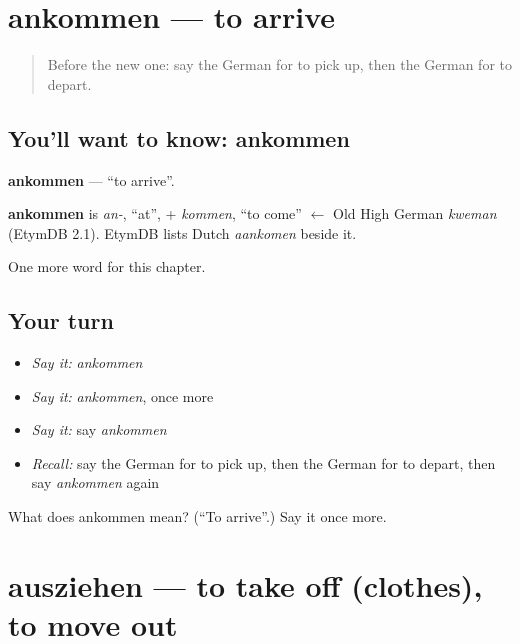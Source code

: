 \section[ankommen]{ankommen — to arrive}

\label{lesson:GE-C174-ankommen}



\begin{quote}
Before the new one: say the German for to pick up, then the German for to depart.
\end{quote}

\subsection*{You'll want to know: ankommen}
\textbf{ankommen} — \textquotedblleft{}to arrive\textquotedblright{}.

\begin{cousinweb}
\textbf{ankommen} is \emph{an-}, \textquotedblleft{}at\textquotedblright{}, + \emph{kommen}, \textquotedblleft{}to come\textquotedblright{} $\leftarrow$ Old High German \emph{kweman} (EtymDB 2.1). EtymDB lists Dutch \emph{aankomen} beside it.
\end{cousinweb}

\begin{grammarlens}[title={What you've built}]
One more word for this chapter.
\end{grammarlens}

\subsection*{Your turn}
\begin{itemize}
\raggedright
  \item \emph{Say it:} \emph{ankommen}
  \item \emph{Say it:} \emph{ankommen}, once more
  \item \emph{Say it:} say \emph{ankommen}
  \item \emph{Recall:} say the German for to pick up, then the German for to depart, then say \emph{ankommen} again
\end{itemize}

\begin{tcolorbox}[breakable,colback=teal!4,colframe=teal!35!black,title={Before you move on}]
What does ankommen mean? (\textquotedblleft{}To arrive\textquotedblright{}.) Say it once more.
\end{tcolorbox}
\section[ausziehen]{ausziehen — to take off (clothes), to move out}

